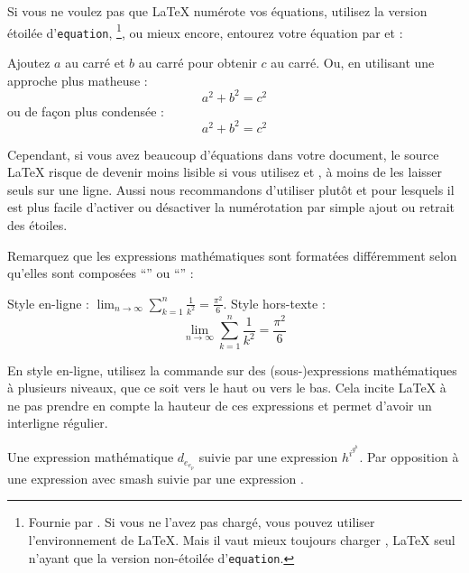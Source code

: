Si vous ne voulez pas que \LaTeX{} numérote vos équations, utilisez la
version étoilée d'\texttt{equation}, \footnote{Fournie par
  . Si vous ne l'avez pas chargé, vous pouvez utiliser
  l'environnement  de \LaTeX{}. Mais il vaut mieux toujours
  charger , \LaTeX{} seul n'ayant que la version
  non-étoilée d'\texttt{equation}.}, ou mieux encore,
entourez votre équation par \ci{[} et \ci{]} :
\begin{example}
Ajoutez $a$ au carré 
et $b$ au carré pour obtenir
$c$ au carré. Ou, en 
utilisant une approche plus
matheuse :
\begin{equation*}
  a^2 + b^2 = c^2
\end{equation*}
ou de façon plus condensée :
\[ a^2 + b^2 = c^2 \]
\end{example}

Cependant, si vous avez beaucoup d'équations dans votre document, le source
\LaTeX{} risque de devenir moins lisible si vous utilisez \ci{[\iffalse]\fi}
et \ci{\iffalse[\fi]}, à moins de les laisser seuls sur une
ligne. Aussi nous recommandons d'utiliser plutôt  et
 pour lesquels il est plus facile d'activer ou
désactiver la numérotation par simple ajout ou retrait des étoiles.

Remarquez que les expressions mathématiques sont formatées
différemment selon qu'elles sont composées \enquote{} ou
\enquote{} :
 \begin{example}
Style en-ligne :
$\lim_{n \to \infty} 
\sum_{k=1}^n \frac{1}{k^2} 
= \frac{\pi^2}{6}$.
Style hors-texte :
\begin{equation}
  \lim_{n \to \infty} 
  \sum_{k=1}^n \frac{1}{k^2} 
  = \frac{\pi^2}{6}
\end{equation}
\end{example}

En style en-ligne, utilisez la commande  sur des
(sous-)expressions mathématiques à plusieurs niveaux, que ce soit vers
le haut ou vers le bas. Cela incite \LaTeX{} à ne pas prendre en
compte la hauteur de ces expressions et permet d'avoir un interligne
régulier.

\begin{example}
Une expression mathématique
$d_{e_{e_p}}$ suivie par une
expression $h^{i^{g^h}}$. Par
opposition à une expression
avec smash 
suivie par une expression
.
\end{example}


